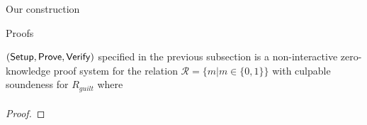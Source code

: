 \begin{section}{Our construction}
  
  \begin{subsection}{Proofs}
    \begin{lemma}
      $({\mathsf{Setup}}, {\mathsf{Prove}}, {\mathsf{Verify}})$ specified in the previous subsection is a non-interactive zero-knowledge proof system for the relation $\mathcal{R} = \{ m | m \in \{0,1\}\}$ with culpable soundeness for $R_{guilt}$ where
      \begin{align*}
        
      \end{align*}
    \end{lemma}

    \begin{proof}
      
    \end{proof}
  \end{subsection}

\end{section}
